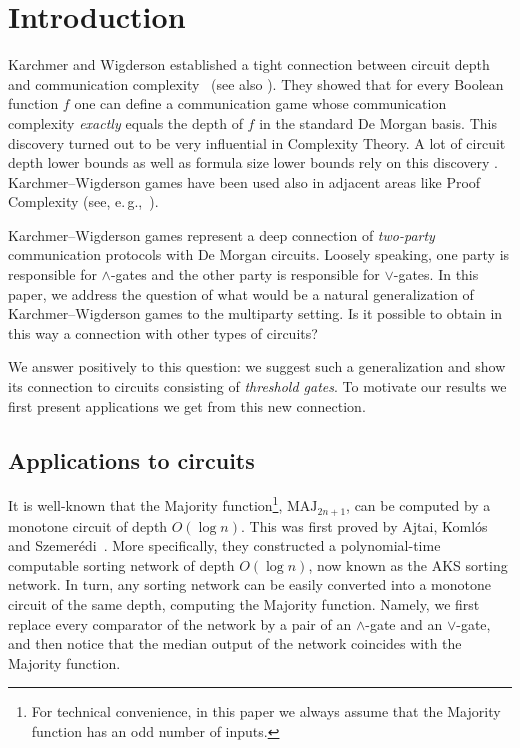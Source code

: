 \documentclass[11pt]{article}
\numberwithin{equation}{section}
\theoremstyle{definition}
\theoremstyle{plain}
\newcommand{\eg}{e.\,g.}
\def\MAJ{\mathrm{MAJ}}
\begin{document}
%
%
%

%

 \section{Introduction} \label{sec:intro}


Karchmer and Wigderson established a tight connection between circuit depth
and communication complexity~\cite{KW90} (see also \cite[Chapter 9]{rao_yehudayoff_2020}).  %
They  %
showed that for every Boolean function $f$ one can define a communication game whose communication complexity \emph{exactly} equals the depth of $f$ in the standard De Morgan basis. This discovery turned out to be very influential in Complexity Theory. A lot of circuit depth lower bounds as well as formula size lower bounds rely on this discovery \cite{KRW95, RM97, GMWW2014, GP2014, DM2018}. Karchmer--Wigderson games have been used also in adjacent areas like Proof Complexity (see, \eg,~\cite{Sok2017}).

Karchmer--Wigderson games represent a deep connection of \emph{two-party} communication protocols with De Morgan circuits. Loosely speaking, one party is responsible for $\land$-gates and the other party is responsible for $\lor$-gates. In this paper, we address the question of what would be a natural generalization of Karchmer--Wigderson games to the multiparty setting. Is it possible to obtain in this way a connection with other types of circuits?

We answer positively to this question: we suggest such a generalization and show its connection to circuits consisting of \emph{threshold gates}. To motivate our results we first present applications we get from this new connection.

\subsection{Applications to circuits}

It is well-known that the Majority function\footnote{For technical convenience, in this paper we always assume that the Majority function has an odd number of inputs.},  $\MAJ_{2n + 1}$, can be computed by 
%
a monotone circuit of depth $O(\log n)$.  %
This was first proved by Ajtai, Koml\'{o}s and Szemer\'{e}di~\cite{AKS83}. More specifically, they constructed a polynomial-time computable 
%
sorting network of depth $O(\log n)$, %
now known as the AKS sorting network. In turn, any sorting network can be easily converted into a monotone circuit of the same depth, computing the Majority function. Namely, we first replace every comparator of the network by a pair of an $\land$-gate and an $\lor$-gate, and then notice that the median output of the network coincides with the Majority function.
\end{document}
